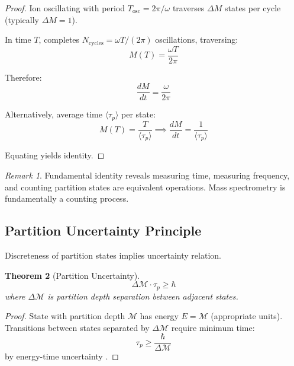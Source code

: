 \documentclass[twocolumn,10pt]{revtex4-2}
\newtheorem{theorem}{Theorem}[section]
\theoremstyle{definition}
\theoremstyle{remark}
\newtheorem{remark}[theorem]{Remark}
\newcommand{\Mdepth}{\mathcal{M}}
\newcommand{\taup}{\tau_p}
\begin{document}
\begin{proof}
Ion oscillating with period $T_{\mathrm{osc}} = 2\pi/\omega$ traverses $\Delta M$ states per cycle (typically $\Delta M = 1$).

In time $T$, completes $N_{\mathrm{cycles}} = \omega T/(2\pi)$ oscillations, traversing:
\begin{equation}
M(T) = \frac{\omega T}{2\pi}
\end{equation}

Therefore:
\begin{equation}
\frac{dM}{dt} = \frac{\omega}{2\pi}
\label{eq:counting_rate_freq}
\end{equation}

Alternatively, average time $\langle\taup\rangle$ per state:
\begin{equation}
M(T) = \frac{T}{\langle\taup\rangle} \implies \frac{dM}{dt} = \frac{1}{\langle\taup\rangle}
\label{eq:counting_rate_tau}
\end{equation}

Equating yields identity.
\end{proof}

\begin{remark}
Fundamental identity reveals measuring time, measuring frequency, and counting partition states are equivalent operations. Mass spectrometry is fundamentally a counting process.
\end{remark}

\subsection{Partition Uncertainty Principle}

Discreteness of partition states implies uncertainty relation.

\begin{theorem}[Partition Uncertainty]
\label{thm:uncertainty}
\begin{equation}
\boxed{\Delta\Mdepth \cdot \taup \geq \hbar}
\label{eq:partition_uncertainty}
\end{equation}
where $\Delta\Mdepth$ is partition depth separation between adjacent states.
\end{theorem}

\begin{proof}
State with partition depth $\Mdepth$ has energy $E = \Mdepth$ (appropriate units). Transitions between states separated by $\Delta\Mdepth$ require minimum time:
\begin{equation}
\taup \geq \frac{\hbar}{\Delta\Mdepth}
\end{equation}
by energy-time uncertainty \cite{Mandelstam1991}.
\end{proof}
\end{document}
